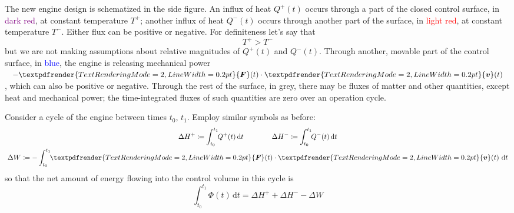 \documentclass[a4paper,12pt,%
onecolumn,oneside,%
british%
]{memoir}
\renewcommand*{\bm}[1]{\textpdfrender{TextRenderingMode=2,LineWidth=0.2pt}{\boldsymbol{#1}}}
\newcommand*{\di}{\mathrm{d}}%
\newcommand*{\incr}{\Delta}%
\newcommand*{\defd}{\coloneqq}
\renewcommand*{\|}[1][]{\nonscript\:#1\vert\nonscript\:\mathopen{}}
\newcommand*{\yv}{\bm{v}}
\newcommand*{\yti}{t_{0}}
\newcommand*{\ytf}{t_{1}}
\newcommand*{\dt}{\di t}
\newcommand*{\yH}{\varPhi}%
\newcommand*{\yQ}{Q}%
\newcommand*{\yQp}{\yQ^{+}}%
\newcommand*{\yQm}{\yQ^{-}}%
\newcommand*{\yhep}{\incr H^{+}}%
\newcommand*{\yhem}{\incr H^{-}}%
\newcommand*{\yW}{\incr W}%
\newcommand*{\yF}{\bm{F}}
\newcommand*{\yT}{T}%
\newcommand*{\yTp}{\yT^{+}}%
\newcommand*{\yTm}{\yT^{-}}%
\begin{document}
The new engine design is schematized in the side figure. An influx of heat $\yQp(t)$ occurs through a part of the closed control surface, in \textcolor{purple}{dark red}, at constant temperature $\yTp$; another influx of heat $\yQm(t)$ occurs through another part of the surface, in \textcolor{red}{light red}, at constant temperature $\yTm$. Either flux can be positive or negative. For definiteness let's say that
\begin{equation*}
  \yTp > \yTm
\end{equation*}
but we are not making assumptions about relative magnitudes of $\yQp(t)$ and $\yQm(t)$. Through another, movable part of the control surface, in \textcolor{blue}{blue}, the engine is releasing mechanical power $-\yF(t)\cdot\yv(t)$, which can also be positive or negative. Through the rest of the surface, in \textcolor{midgrey}{grey}, there may be fluxes of matter and other quantities, except heat and mechanical power; the time-integrated fluxes of such quantities are zero over an operation cycle.
%
%

Consider a cycle of the engine between times $\yti$, $\ytf$. Employ similar symbols as before:
\begin{equation*}
  \begin{gathered}
    \yhep \defd \int_{\yti}^{\ytf}\!\!\yQp(t)\,\dt
    \qquad\qquad
    \yhem \defd \int_{\yti}^{\ytf}\!\!\yQm(t)\,\dt
    \\
    \yW \defd -\int_{\yti}^{\ytf}\!\!\yF(t)\cdot\yv(t)\ \dt
  \end{gathered}
\end{equation*}
so that the net amount of energy flowing into the control volume in this cycle is
\begin{equation*}
  \int_{\yti}^{\ytf}\!\!\yH(t)\,\dt =
 \yhep + \yhem -\yW
\end{equation*}
\end{document}
